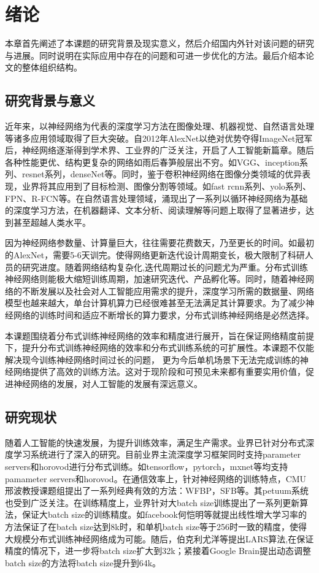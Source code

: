 \chapter{绪论}
本章首先阐述了本课题的研究背景及现实意义，然后介绍国内外针对该问题的研究与进展。同时说明在实际应用中存在的问题和可进一步优化的方法。最后介绍本论文的整体组织结构。
\section{研究背景与意义}
近年来，以神经网络为代表的深度学习方法在图像处理、机器视觉、自然语言处理等诸多应用领域取得了巨大突破。自2012年AlexNet以绝对优势夺得ImageNet冠军后，神经网络逐渐得到学术界、工业界的广泛关注，开启了人工智能新篇章。随后各种性能更优、结构更复杂的网络如雨后春笋般层出不穷。如VGG、inception系列、resnet系列，denseNet等。同时，鉴于卷积神经网络在图像分类领域的优异表现，业界将其应用到了目标检测、图像分割等领域。如fast rcnn系列、yolo系列、FPN、R-FCN等。在自然语言处理领域，涌现出了一系列以循环神经网络为基础的深度学习方法，在机器翻译、文本分析、阅读理解等问题上取得了显著进步，达到甚至超越人类水平。

因为神经网络参数量、计算量巨大，往往需要花费数天，乃至更长的时间。如最初的AlexNet，需要5-6天训完。使得网络更新迭代设计周期变长，极大限制了科研人员的研究进度。随着网络结构复杂化,迭代周期过长的问题尤为严重。分布式训练神经网络则能极大缩短训练周期，加速研究迭代、产品孵化等。同时，随着神经网络的不断发展以及社会对人工智能应用需求的提升，深度学习所需的数据量、网络模型也越来越大，单台计算机算力已经很难甚至无法满足其计算要求。为了减少神经网络的训练时间和适应不断增长的算力要求，分布式训练神经网络是必然选择。

本课题围绕着分布式训练神经网络的效率和精度进行展开，旨在保证网络精度前提下，提升分布式训练神经网络的效率和分布式训练系统的可扩展性。本课题不仅能解决现今训练神经网络时间过长的问题， 更为今后单机场景下无法完成训练的神经网络提供了高效的训练方法。这对于现阶段和可预见未来都有重要实用价值，促进神经网络的发展，对人工智能的发展有深远意义。

\section{研究现状}
随着人工智能的快速发展，为提升训练效率，满足生产需求。业界已针对分布式深度学习系统进行了深入的研究。目前业界主流深度学习框架同时支持parameter servers和horovod进行分布式训练。如tensorflow，pytorch，mxnet等均支持pamameter servers和horovod。在通信效率上，针对神经网络的训练特点，CMU邢波教授课题组提出了一系列经典有效的方法：WFBP，SFB等。其petuum系统也受到广泛关注。在训练精度上，业界针对大batch size训练提出了一系列更新算法，保证大batch size的训练精度。如facebook何恺明等就提出线性增大学习率的方法保证了在batch size达到8k时，和单机batch size等于256时一致的精度，使得大规模分布式训练神经网络成为可能。随后，伯克利尤洋等提出LARS算法,在保证精度的情况下，进一步将batch size扩大到32k；紧接着Google Brain提出动态调整batch size的方法将batch size提升到64k。
